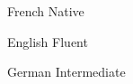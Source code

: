 
French Native \hfill \faStar\faStar\faStar\faStar\faStar

English Fluent \hfill \faStar\faStar\faStar\faStar\faStar

German Intermediate \hfill \faStar\faStar
